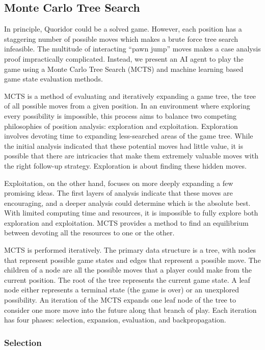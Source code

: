 \documentclass[10pt]{article}
\begin{document}
\subsection{Monte Carlo Tree Search}

In principle, Quoridor could be a solved game. However, each position has a staggering number of possible moves which makes a brute force tree search infeasible. The multitude of interacting ``pawn jump'' moves makes a case analysis proof impractically complicated. Instead, we present an AI agent to play the game using a Monte Carlo Tree Search (MCTS) and machine learning based game state evaluation methods.

MCTS is a method of evaluating and iteratively expanding a game tree, the tree of all possible moves from a given position.\cite{russell2020aima} In an environment where exploring every possibility is impossible, this process aims to balance two competing philosophies of position analysis: exploration and exploitation. Exploration involves devoting time to expanding less-searched areas of the game tree. While the initial analysis indicated that these potential moves had little value, it is possible that there are intricacies that make them extremely valuable moves with the right follow-up strategy. Exploration is about finding these hidden moves.

Exploitation, on the other hand, focuses on more deeply expanding a few promising ideas. The first layers of analysis indicate that these moves are encouraging, and a deeper analysis could determine which is the absolute best. With limited computing time and resources, it is impossible to fully explore both exploration and exploitation. MCTS provides a method to find an equilibrium between devoting all the resources to one or the other.

MCTS is performed iteratively. The primary data structure is a tree, with nodes that represent possible game states and edges that represent a possible move. The children of a node are all the possible moves that a player could make from the current position. The root of the tree represents the current game state. A leaf node either represents a terminal state (the game is over) or an unexplored possibility. An iteration of the MCTS expands one leaf node of the tree to consider one more move into the future along that branch of play. Each iteration has four phases: selection, expansion, evaluation, and backpropagation.

\subsubsection{Selection}
\end{document}
